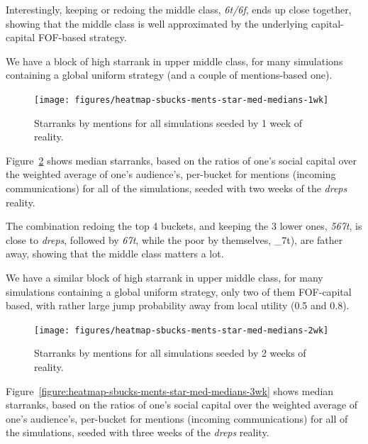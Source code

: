 \documentclass[10pt,oneside]{memoir}
\begin{document}
\begin{Spacing}{2}
Interestingly, keeping or redoing the middle class, {\itshape 6t/6f}, ends up close together, showing that the middle class is well approximated by the underlying capital-capital FOF-based strategy.


We have a block of high starrank in upper middle class, for many simulations containing a global uniform strategy (and a couple of mentions-based one).



\begin{figure}
\begin{center}
    \texttt{[image: figures/heatmap-sbucks-ments-star-med-medians-1wk]}
    \caption{Starranks by mentions for all simulations seeded by 1 week of reality.}
    \label{figure:heatmap-sbucks-ments-star-med-medians-1wk}
\end{center}
\end{figure}
Figure~\ref{figure:heatmap-sbucks-ments-star-med-medians-2wk} shows median starranks, based on the ratios of one's social capital over the weighted average of one's audience's, per-bucket for mentions (incoming communications) for all of the simulations, seeded with two weeks of the {\itshape dreps} reality.


The combination redoing the top 4 buckets, and keeping the 3 lower ones, {\itshape 567t}, is close to {\itshape dreps}, followed by {\itshape 67t}, while the poor by themselves, \_7t), are father away, showing that the middle class matters a lot.


We have a similar block of high starrank in upper middle class, for many simulations containing a global uniform strategy, only two of them FOF-capital based, with rather large jump probability away from local utility (0.5 and 0.8).



\begin{figure}
\begin{center}
    \texttt{[image: figures/heatmap-sbucks-ments-star-med-medians-2wk]}
    \caption{Starranks by mentions for all simulations seeded by 2 weeks of reality.}
    \label{figure:heatmap-sbucks-ments-star-med-medians-2wk}
\end{center}
\end{figure}
Figure~\ref{figure:heatmap-sbucks-ments-star-med-medians-3wk} shows median starranks, based on the ratios of one's social capital over the weighted average of one's audience's, per-bucket for mentions (incoming communications) for all of the simulations, seeded with three weeks of the {\itshape dreps} reality.



\end{Spacing}
\end{document}
